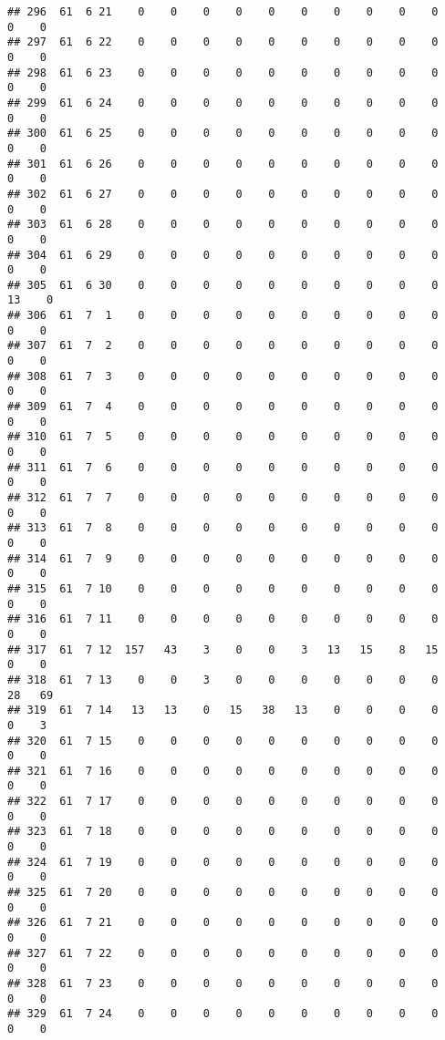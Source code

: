\documentclass[]{article}
\begin{document}
\begin{verbatim}
## 296  61  6 21    0    0    0    0    0    0    0    0    0    0    0    0
## 297  61  6 22    0    0    0    0    0    0    0    0    0    0    0    0
## 298  61  6 23    0    0    0    0    0    0    0    0    0    0    0    0
## 299  61  6 24    0    0    0    0    0    0    0    0    0    0    0    0
## 300  61  6 25    0    0    0    0    0    0    0    0    0    0    0    0
## 301  61  6 26    0    0    0    0    0    0    0    0    0    0    0    0
## 302  61  6 27    0    0    0    0    0    0    0    0    0    0    0    0
## 303  61  6 28    0    0    0    0    0    0    0    0    0    0    0    0
## 304  61  6 29    0    0    0    0    0    0    0    0    0    0    0    0
## 305  61  6 30    0    0    0    0    0    0    0    0    0    0   13    0
## 306  61  7  1    0    0    0    0    0    0    0    0    0    0    0    0
## 307  61  7  2    0    0    0    0    0    0    0    0    0    0    0    0
## 308  61  7  3    0    0    0    0    0    0    0    0    0    0    0    0
## 309  61  7  4    0    0    0    0    0    0    0    0    0    0    0    0
## 310  61  7  5    0    0    0    0    0    0    0    0    0    0    0    0
## 311  61  7  6    0    0    0    0    0    0    0    0    0    0    0    0
## 312  61  7  7    0    0    0    0    0    0    0    0    0    0    0    0
## 313  61  7  8    0    0    0    0    0    0    0    0    0    0    0    0
## 314  61  7  9    0    0    0    0    0    0    0    0    0    0    0    0
## 315  61  7 10    0    0    0    0    0    0    0    0    0    0    0    0
## 316  61  7 11    0    0    0    0    0    0    0    0    0    0    0    0
## 317  61  7 12  157   43    3    0    0    3   13   15    8   15    0    0
## 318  61  7 13    0    0    3    0    0    0    0    0    0    0   28   69
## 319  61  7 14   13   13    0   15   38   13    0    0    0    0    0    3
## 320  61  7 15    0    0    0    0    0    0    0    0    0    0    0    0
## 321  61  7 16    0    0    0    0    0    0    0    0    0    0    0    0
## 322  61  7 17    0    0    0    0    0    0    0    0    0    0    0    0
## 323  61  7 18    0    0    0    0    0    0    0    0    0    0    0    0
## 324  61  7 19    0    0    0    0    0    0    0    0    0    0    0    0
## 325  61  7 20    0    0    0    0    0    0    0    0    0    0    0    0
## 326  61  7 21    0    0    0    0    0    0    0    0    0    0    0    0
## 327  61  7 22    0    0    0    0    0    0    0    0    0    0    0    0
## 328  61  7 23    0    0    0    0    0    0    0    0    0    0    0    0
## 329  61  7 24    0    0    0    0    0    0    0    0    0    0    0    0

\end{verbatim}
\end{document}
